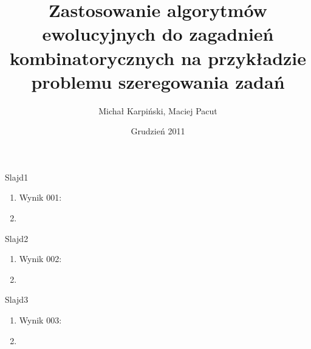 \documentclass{beamer}
\title{Zastosowanie algorytmów ewolucyjnych do zagadnień kombinatorycznych na przykładzie problemu szeregowania zadań}
\author{Michał Karpiński, Maciej Pacut}
\date{Grudzień 2011}
\begin{document}
\maketitle
 
\begin{frame}{Slajd1}
  \begin{enumerate}
    \item Wynik 001:
    \item 
  \end{enumerate}
\end{frame}

\begin{frame}{Slajd2}
  \begin{enumerate}
    \item Wynik 002:
    \item 
  \end{enumerate}
\end{frame}

\begin{frame}{Slajd3}
  \begin{enumerate}
    \item Wynik 003:
    \item 
  \end{enumerate}
\end{frame}
\end{document}
